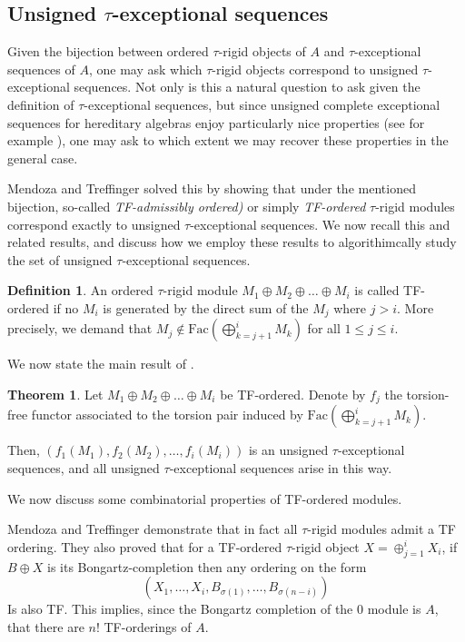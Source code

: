 \documentclass[]{article}
\theoremstyle{definition}
\newtheorem{definition}{Definition}[section]
\newtheorem{theorem}{Theorem}[section]
\newcommand{\tu}{\ensuremath{\tau}}
\begin{document}
\subsection{Unsigned \tu-exceptional sequences}
Given the bijection between ordered \tu-rigid objects of $A$ and \tu-exceptional sequences of $A$, one may ask which \tu-rigid objects correspond to unsigned \tu-exceptional sequences. Not only is this a natural question to ask given the definition of \tu-exceptional sequences, but since unsigned complete exceptional sequences for hereditary algebras enjoy particularly nice properties (see for example \cite{ringel_exceptional}), one may ask to which extent we may recover these properties in the general case.

Mendoza and Treffinger\cite{mendoza2020stratifying} solved this by showing that under the mentioned bijection, so-called \textit{TF-admissibly ordered)} or simply \textit{TF-ordered} \tu-rigid modules correspond exactly to unsigned \tu-exceptional sequences. We now recall this and related results, and discuss how we employ these results to algorithimcally study the set of unsigned \tu-exceptional sequences.

\begin{definition}\cite{mendoza2020stratifying}
	An ordered \tu-rigid module $M_1 \oplus M_2 \oplus \dots \oplus M_i$ is called TF-ordered if no $M_i$ is generated by the direct sum of the $M_j$ where $j > i$. More precisely, we demand that $M_j \notin \text{Fac}(\bigoplus_{k = j+1}^i M_k)$ for all $1 \leq j \leq i$.
\end{definition}

We now state the main result of \cite{mendoza2020stratifying}.

\begin{theorem}\cite{mendoza2020stratifying}\label{tf-to-tau}
	Let $M_1 \oplus M_2 \oplus \dots \oplus M_i$ be TF-ordered. Denote by $f_j$ the torsion-free functor associated to the torsion pair induced by $\text{Fac}(\bigoplus_{k = j+1}^i M_k)$.
	
	Then, $(f_1(M_1),f_2(M_2),\dots,f_i(M_i))$ is an unsigned \tu-exceptional sequences, and all unsigned \tu-exceptional sequences arise in this way.
\end{theorem}

We now discuss some combinatorial properties of TF-ordered modules.

Mendoza and Treffinger demonstrate that in fact all \tu-rigid modules admit a TF ordering. They also proved that for a TF-ordered \tu-rigid object $X = \oplus_{j = 1}^i X_i$, if $B \oplus X$ is its Bongartz-completion then any ordering on the form \[(X_1,\dots,X_i,B_{\sigma(1)},\dots,B_{\sigma(n-i)})\]
Is also TF. This implies, since the Bongartz completion of the $0$ module is $A$, that there are $n!$ TF-orderings of $A$. 
\end{document}
